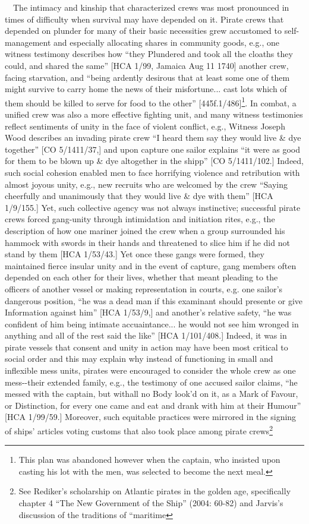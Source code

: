\documentclass[12pt]{article}
\newenvironment{styleStandard}{\renewcommand\baselinestretch{1.0}\setlength\leftskip{0cm}\setlength\rightskip{0cm plus 1fil}\setlength\parindent{0cm}\setlength\parfillskip{0pt plus 1fil}\setlength\parskip{0in plus 1pt}\writerlistparindent\writerlistleftskip\leavevmode\normalfont\normalsize\writerlistlabel\ignorespaces}{\unskip\vspace{0in plus 1pt}\par}
\newcommand\writerlistleftskip{}
\newcommand\writerlistparindent{}
\newcommand\writerlistlabel{}
\begin{document}
\begin{styleStandard}
\ \ The intimacy and kinship that characterized crews was most pronounced in times of difficulty when survival may have depended on it. Pirate crews that depended on plunder for many of their basic necessities grew accustomed to self-management and especially allocating shares in community goods, e.g., one witness testimony describes how “they Plundered and took all the cloaths they could, and shared the same” [HCA 1/99, Jamaica Aug 11 1740] another crew, facing starvation, and “being ardently desirous that at least some one of them might survive to carry home the news of their misfortune... cast lots which of them should be killed to serve for food to the other” [445f.1/486]\footnote{ This plan was abandoned however when the captain, who insisted upon casting his lot with the men, was selected to become the next meal. }. In combat, a unified crew was also a more effective fighting unit, and many witness testimonies reflect sentiments of unity in the face of violent conflict, e.g., Witness Joseph Wood describes an invading pirate crew “I heard them say they would live \& dye together” [CO 5/1411/37,] and upon capture one sailor explains “it were as good for them to be blown up \& dye altogether in the shipp” [CO 5/1411/102.] Indeed, such social cohesion enabled men to face horrifying violence and retribution with almost joyous unity, e.g., new recruits who are welcomed by the crew “Saying cheerfully and unanimously that they would live \& dye with them” [HCA 1/9/155.] Yet, such collective agency was not always instinctive; successful pirate crews forced gang-unity through intimidation and initiation rites, e.g., the description of how one mariner joined the crew when a group surrounded his hammock with swords in their hands and threatened to slice him if he did not stand by them [HCA 1/53/43.] Yet once these gangs were formed, they maintained fierce insular unity and in the event of capture, gang members often depended on each other for their lives, whether that meant pleading to the officers of another vessel or making representation in courts, e.g. one sailor’s dangerous position, “he was a dead man if this examinant should presente or give Information against him” [HCA 1/53/9,] and another’s relative safety, “he was confident of him being intimate accuaintance... he would not see him wronged in anything and all of the rest said the like” [HCA 1/101/408.] Indeed, it was in pirate vessels that consent and unity in action may have been most critical to social order and this may explain why instead of functioning in small and inflexible mess units, pirates were encouraged to consider the whole crew as one mess-{}-their extended family, e.g., the testimony of one accused sailor claims, “he messed with the captain, but withall no Body look’d on it, as a Mark of Favour, or Distinction, for every one came and eat and drank with him at their Humour” [HCA 1/99/59.] Moreover, such equitable practices were mirrored in the signing of ships’ articles voting customs that also took place among pirate crews\footnote{ See Rediker’s scholarship on Atlantic pirates in the golden age, specifically chapter 4 “The New Government of the Ship” (2004: 60-82) and Jarvis’s discussion of the traditions of “maritime 
\end{styleStandard}
\end{document}
